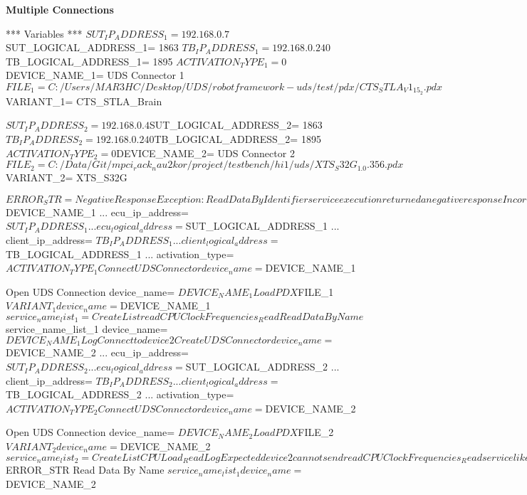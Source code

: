 \textbf{Multiple Connections}
\begin{robotcode}
*** Variables ***
${SUT_IP_ADDRESS_1}=    192.168.0.7
${SUT_LOGICAL_ADDRESS_1}=    1863
${TB_IP_ADDRESS_1}=    192.168.0.240
${TB_LOGICAL_ADDRESS_1}=    1895
${ACTIVATION_TYPE_1}=    0
${DEVICE_NAME_1}=    UDS Connector 1
${FILE_1}=    C:/Users/MAR3HC/Desktop/UDS/robotframework-uds/test/pdx/CTS_STLA_V1_15_2.pdx
${VARIANT_1}=    CTS_STLA_Brain

${SUT_IP_ADDRESS_2}=    192.168.0.4
${SUT_LOGICAL_ADDRESS_2}=    1863
${TB_IP_ADDRESS_2}=    192.168.0.240
${TB_LOGICAL_ADDRESS_2}=    1895
${ACTIVATION_TYPE_2}=    0
${DEVICE_NAME_2}=    UDS Connector 2
${FILE_2}=    C:/Data/Git/mpci_rack_nau2kor/project/testbench/hi1/uds/XTS_S32G_1.0.356.pdx
${VARIANT_2}=    XTS_S32G

${ERROR_STR}=    NegativeResponseException: ReadDataByIdentifier service execution returned a negative response IncorrectMessageLengthOrInvalidFormat (0x13)

*** Test Cases ***
Test user can connect multiple UDS connection
    Log    Test user can connect multiple UDS connection
    Log    Connect to device 1
    Create UDS Connector    device_name= ${DEVICE_NAME_1}
    ...                     ecu_ip_address= ${SUT_IP_ADDRESS_1}
    ...                     ecu_logical_address= ${SUT_LOGICAL_ADDRESS_1}
    ...                     client_ip_address= ${TB_IP_ADDRESS_1}
    ...                     client_logical_address= ${TB_LOGICAL_ADDRESS_1}
    ...                     activation_type= ${ACTIVATION_TYPE_1}
    Connect UDS Connector   device_name= ${DEVICE_NAME_1}

    Open UDS Connection    device_name= ${DEVICE_NAME_1}
    Load PDX    ${FILE_1}    ${VARIANT_1}    device_name= ${DEVICE_NAME_1}
    ${service_name_list_1}=    Create List    readCPUClockFrequencies_Read
    Read Data By Name    ${service_name_list_1}    device_name= ${DEVICE_NAME_1}

    Log    Connect to device 2
    Create UDS Connector    device_name= ${DEVICE_NAME_2}
    ...                     ecu_ip_address= ${SUT_IP_ADDRESS_2}
    ...                     ecu_logical_address= ${SUT_LOGICAL_ADDRESS_2}
    ...                     client_ip_address= ${TB_IP_ADDRESS_2}
    ...                     client_logical_address= ${TB_LOGICAL_ADDRESS_2}
    ...                     activation_type= ${ACTIVATION_TYPE_2}
    Connect UDS Connector    device_name= ${DEVICE_NAME_2}

    Open UDS Connection    device_name= ${DEVICE_NAME_2}
    Load PDX    ${FILE_2}    ${VARIANT_2}    device_name= ${DEVICE_NAME_2}
    ${service_name_list_2}=    Create List    CPULoad_Read
    Log    Expected device 2 cannot send readCPUClockFrequencies_Read service like device 1
    Run Keyword And Expect Error    ${ERROR_STR}    Read Data By Name    ${service_name_list_1}    device_name= ${DEVICE_NAME_2}


\end{robotcode}
